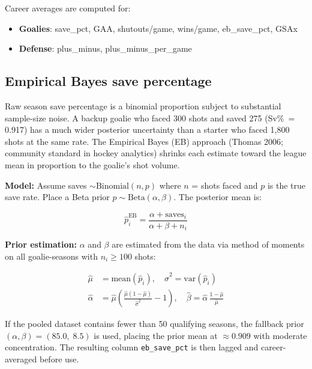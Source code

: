\documentclass[11pt, a4paper]{article}
\begin{document}
Career averages are computed for:
\begin{itemize}[leftmargin=*]
  \item \textbf{Goalies}: save\_pct, GAA, shutouts/game, wins/game, eb\_save\_pct, GSAx
  \item \textbf{Defense}: plus\_minus, plus\_minus\_per\_game
\end{itemize}

\subsection{Empirical Bayes save percentage}
\label{sec:eb}

Raw season save percentage is a binomial proportion subject to substantial sample-size noise.
A backup goalie who faced 300 shots and saved 275 (Sv\%\ = 0.917) has a much wider posterior
uncertainty than a starter who faced 1,800 shots at the same rate. The Empirical Bayes (EB)
approach (Thomas 2006; community standard in hockey analytics) shrinks each estimate toward the
league mean in proportion to the goalie's shot volume.

\textbf{Model:} Assume saves $\sim \text{Binomial}(n, p)$ where $n$ = shots faced and $p$ is
the true save rate. Place a Beta prior $p \sim \text{Beta}(\alpha, \beta)$.
The posterior mean is:

\begin{equation}
  \hat{p}_{i}^{\text{EB}} = \frac{\alpha + \text{saves}_i}{\alpha + \beta + n_i}
  \label{eq:eb}
\end{equation}

\textbf{Prior estimation:} $\alpha$ and $\beta$ are estimated from the data via method of
moments on all goalie-seasons with $n_i \geq 100$ shots:

\begin{align}
  \hat{\mu} &= \text{mean}(\hat{p}_i), \quad
  \hat{\sigma}^2 = \text{var}(\hat{p}_i) \\
  \hat{\alpha} &= \hat{\mu}\!\left(\frac{\hat{\mu}(1-\hat{\mu})}{\hat{\sigma}^2} - 1\right),
  \quad
  \hat{\beta} = \hat{\alpha}\,\frac{1 - \hat{\mu}}{\hat{\mu}}
\end{align}

If the pooled dataset contains fewer than 50 qualifying seasons, the fallback prior
$(\alpha, \beta) = (85.0,\; 8.5)$ is used, placing the prior mean at $\approx 0.909$ with
moderate concentration. The resulting column \texttt{eb\_save\_pct} is then lagged and
career-averaged before use.
\end{document}
